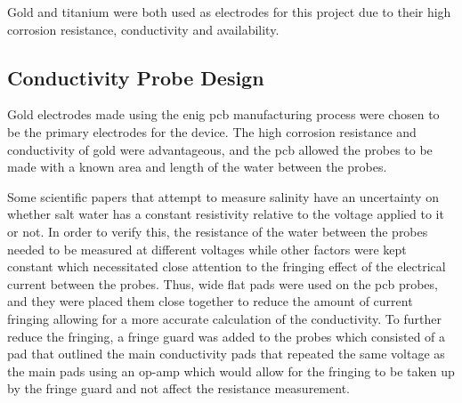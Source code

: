 Gold and titanium were both used as electrodes for this project due to their high corrosion resistance, conductivity and availability.

\subsection{Conductivity Probe Design}

Gold electrodes made using the \gls{enig} \gls{pcb} manufacturing process were chosen to be the primary electrodes for the device.
The high corrosion resistance and conductivity of gold were advantageous, and the \gls{pcb} allowed the probes to be made with a known area and length of the water between the probes.

Some scientific papers that attempt to measure salinity have an uncertainty on whether salt water has a constant resistivity relative to the voltage applied to it or not.
In order to verify this, the resistance of the water between the probes needed to be measured at different voltages while other factors were kept constant which necessitated close attention to the fringing effect of the electrical current between the probes.
Thus, wide flat pads were used on the \gls{pcb} probes, and they were placed them close together to reduce the amount of current fringing allowing for a more accurate calculation of the conductivity.
To further reduce the fringing, a fringe guard was added to the probes which consisted of a pad that outlined the main conductivity pads that repeated the same voltage as the main pads using an op-amp which would allow for the fringing to be taken up by the fringe guard and not affect the resistance measurement.

